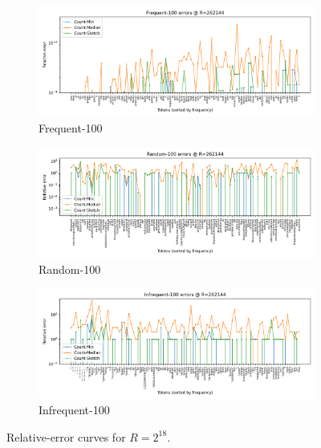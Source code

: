 \documentclass[11pt]{article}
\begin{document}
\begin{figure}[H]
  \centering
  \begin{subfigure}[t]{0.32\linewidth}
    \centering
    \includegraphics[width=\linewidth]{../outputs/a2/errors_R262144_Frequent_100.png}
    \caption{Frequent-100}
  \end{subfigure}\hfill
  \begin{subfigure}[t]{0.32\linewidth}
    \centering
    \includegraphics[width=\linewidth]{../outputs/a2/errors_R262144_Random_100.png}
    \caption{Random-100}
  \end{subfigure}\hfill
  \begin{subfigure}[t]{0.32\linewidth}
    \centering
    \includegraphics[width=\linewidth]{../outputs/a2/errors_R262144_Infrequent_100.png}
    \caption{Infrequent-100}
  \end{subfigure}
  \caption{Relative-error curves for $R=2^{18}$.}
  \label{fig:error-r262144}
\end{figure}
\end{document}
